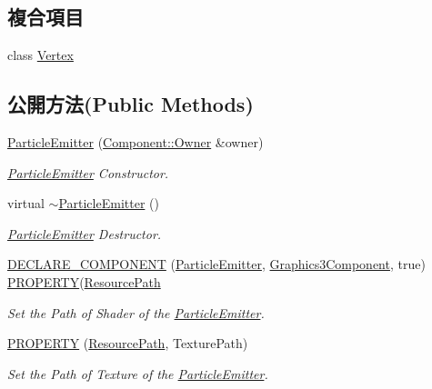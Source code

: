 \subsection*{複合項目}
\begin{DoxyCompactItemize}
\item 
class \hyperlink{class_magnum_1_1_particle_emitter_1_1_vertex}{Vertex}
\end{DoxyCompactItemize}
\subsection*{公開方法(Public Methods)}
\begin{DoxyCompactItemize}
\item 
\hyperlink{class_magnum_1_1_particle_emitter_a92f38966e1f2c07a03e45d599683d947}{Particle\+Emitter} (\hyperlink{class_magnum_1_1_component_1_1_owner}{Component\+::\+Owner} \&owner)
\begin{DoxyCompactList}\small\item\em \hyperlink{class_magnum_1_1_particle_emitter}{Particle\+Emitter} Constructor. \end{DoxyCompactList}\item 
virtual \hyperlink{class_magnum_1_1_particle_emitter_a6f4952f7555ede99d74d42b30c80f3e2}{$\sim$\+Particle\+Emitter} ()
\begin{DoxyCompactList}\small\item\em \hyperlink{class_magnum_1_1_particle_emitter}{Particle\+Emitter} Destructor. \end{DoxyCompactList}\item 
\hyperlink{class_magnum_1_1_particle_emitter_a4780ec4b8c52661b3745f19f3aa1006b}{D\+E\+C\+L\+A\+R\+E\+\_\+\+C\+O\+M\+P\+O\+N\+E\+NT} (\hyperlink{class_magnum_1_1_particle_emitter}{Particle\+Emitter}, \hyperlink{class_magnum_1_1_graphics3_component}{Graphics3\+Component}, true)       \hyperlink{class_magnum_1_1_particle_emitter_a0d043c3b77a3ab06250095c87c107499}{P\+R\+O\+P\+E\+R\+TY}(\hyperlink{class_magnum_1_1_resource_path}{Resource\+Path}
\begin{DoxyCompactList}\small\item\em Set the Path of Shader of the \hyperlink{class_magnum_1_1_particle_emitter}{Particle\+Emitter}. \end{DoxyCompactList}\item 
\hyperlink{class_magnum_1_1_particle_emitter_a0d043c3b77a3ab06250095c87c107499}{P\+R\+O\+P\+E\+R\+TY} (\hyperlink{class_magnum_1_1_resource_path}{Resource\+Path}, Texture\+Path)
\begin{DoxyCompactList}\small\item\em Set the Path of Texture of the \hyperlink{class_magnum_1_1_particle_emitter}{Particle\+Emitter}. \end{DoxyCompactList}\item 

\end{DoxyCompactItemize}
